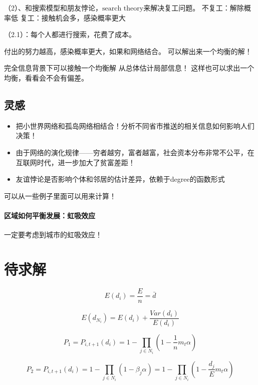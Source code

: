 \documentclass[a4paper]{article}
\begin{document}
（2）、和搜索模型和朋友悖论，$\text{search theory} $来解决复工问题。
不复工：解除概率低
复工：接触机会多，感染概率更大

（2.1）：每个人都进行搜索，花费了成本。

付出的努力越高，感染概率更大，如果和网络结合。
可以解出来一个均衡的解！

完全信息背景下可以接触一个均衡解
从总体估计局部信息！
这样也可以求出一个均衡，看看会不会有偏差。

\subsection{灵感}
\begin{itemize}
	\item 把小世界网络和孤岛网络相结合！分析不同省市推送的相关信息如何影响人们决策！
	\item  由于网络的演化规律——穷者越穷，富者越富，社会资本分布非常不公平，在互联网时代，进一步加大了贫富差距！
	\item  友谊悖论是否影响个体和邻居的估计差异，依赖于degree的函数形式
\end{itemize}

可以从一些例子里面可以用来计算！
\paragraph{区域如何平衡发展：虹吸效应 }
一定要考虑到城市的虹吸效应！
\section{待求解}

\[E({d_i}) = \frac{E}{n} = \bar d\]

\[E({d_{{N_i}}}) = E({d_i}) + \frac{{Var({d_i})}}{{E({d_i})}}\]



\[{P_1} = {P_{i,t + 1}}({d_i}) = 1 - {\prod _{j \in {N_i}}}(1 - \frac{1}{n}{m_t}\alpha )\]

\[{P_2} = {P_{i,t + 1}}({d_i}) = 1 - {\prod _{j \in {N_i}}}(1 - {\beta _j}\alpha ) = 1 - {\prod _{j \in {N_i}}}(1 - \frac{{{d_j}}}{E}{m_t}\alpha )\]








\cite{zuckerman2001makes}

\cite{2001}


\end{document}
